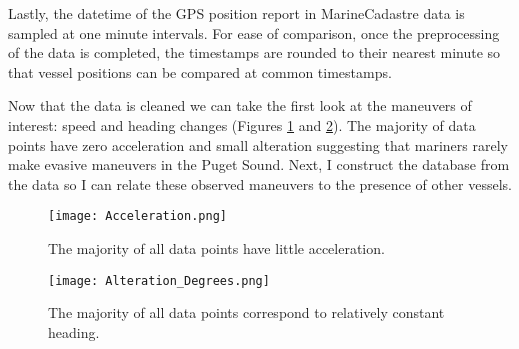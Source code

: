 \documentclass[twoside,symmetric,notoc]{tufte-book}
\begin{document}
\par{%
Lastly, the datetime of the GPS position report in MarineCadastre data is sampled at one minute intervals. For ease of comparison, once the preprocessing of the data is completed, the timestamps are rounded to their nearest minute so that vessel positions can be compared at common timestamps. 
}
\par{%
Now that the data is cleaned we can take the first look at the maneuvers of interest: speed and heading changes (Figures \ref{fig:accel} and \ref{fig:alter}). The majority of data points have zero acceleration and small  alteration suggesting that mariners rarely make evasive maneuvers in the Puget Sound. Next, I construct the database from the data so I can relate these observed maneuvers to the presence of other vessels.
\begin{figure}
    \centering
    \texttt{[image: Acceleration.png]}
    \caption{The majority of all data points have little acceleration.}
    \label{fig:accel}
\end{figure}
\begin{figure}
    \centering
    \texttt{[image: Alteration\_Degrees.png]}
    \caption{The majority of all data points correspond to relatively constant heading.}
    \label{fig:alter}
\end{figure}
}
\end{document}
